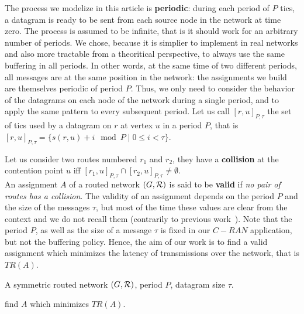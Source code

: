 \documentclass[english]{article}
\begin{document}
 	The process we modelize in this article is \textbf{periodic}: during each period of $P$ tics, a datagram is ready to be sent from each source node in the network at time zero. The process is assumed to be infinite, that is it should work for an arbitrary number of periods. We chose, because it is simplier to implement in real networks and also more tractable from a theoritical perspective, to always use the same buffering in all periods. In other words, at the same time of two different periods, all messages are at the same position in the network: the assignments we build are themselves periodic of period $P$. Thus, we only need to consider the behavior of the datagrams on each node of the network during a single period, and to apply the same pattern to every subsequent period. 
    Let us call $[r,u]_{P,\tau}$ the set of tics used by a datagram on $r$ at vertex $u$ in a period $P$, that is $[r,u]_{P,\tau} = \{s(r,u) + i \mod P \mid 0 \leq i < \tau \}$. 

      Let us consider two routes numbered $r_1$ and $r_2$, they have a {\bf collision} at the contention point $u$ iff $[r_1,u]_{P,\tau} \cap [r_2,u]_{P,\tau} \neq \emptyset$.\\

        An assignment $A$ of a routed network $(G,{\cal R})$ is said to be \textbf{valid} if \emph{no pair of routes has a collision}. 
        The validity of an assignment depends on the period $P$ and the size of the messages $\tau$, but most of the time these values are clear from the context and we do not recall them (contrarily to previous work~\cite{Guir1806:Deterministic}).
        Note that the period $P$, as well as the size of a message $\tau$ is fixed in our $C-RAN$ application, but not the buffering policy. Hence, the aim of our work is to find a valid assignment which minimizes the latency of transmissions over the network, that is $TR(A)$.
        
       

        A symmetric routed network $(G,{\cal R})$, period $P$, datagram size $\tau$.%
      

       find $A$ which minimizes $TR(A)$.
    
    
\end{document}
